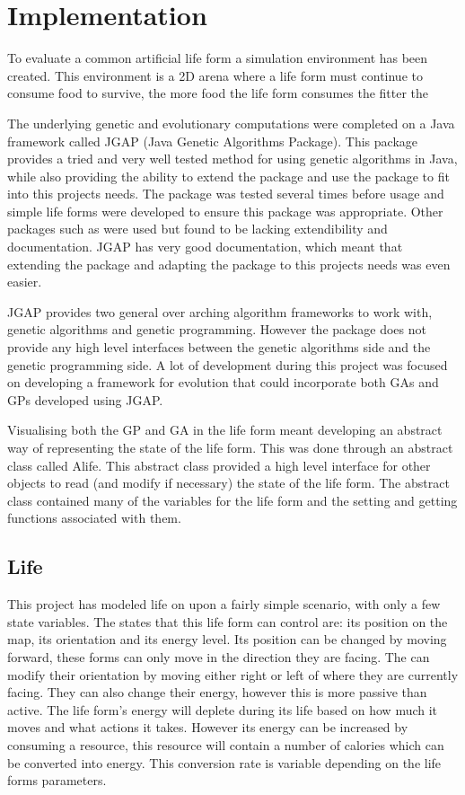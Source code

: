 \documentclass[12pt]{article}
\begin{document}
\section{Implementation}
To evaluate a common artificial life form a simulation environment has been created.
This environment is a 2D arena where a life form must continue to consume food to survive, the more food the life form consumes the fitter the  

The underlying genetic and evolutionary computations were completed on a Java framework called JGAP (Java Genetic Algorithms Package).
This package provides a tried and very well tested method for using genetic algorithms in Java, while also providing the 
ability to extend the package and use the package to fit into this projects needs. The package was tested several times before usage
and simple life forms were developed to ensure this package was appropriate. Other packages such as %
were used but found to be lacking extendibility and documentation. JGAP has very good documentation, which meant that extending
the package and adapting the package to this projects needs was even easier.

JGAP provides two general over arching algorithm frameworks to work with, genetic algorithms and genetic programming. However
the package does not provide any high level interfaces between the genetic algorithms side and the genetic programming side. A 
lot of development during this project was focused on developing a framework for evolution that could incorporate both GAs and GPs developed
using JGAP. 

Visualising both the GP and GA in the life form meant developing an abstract way of representing the state of the life form. This was done
through an abstract class called Alife. This abstract class provided a high level interface for other objects to read (and modify if necessary)
the state of the life form. The abstract class contained many of the variables for the life form and the setting and getting functions 
associated with them. 

\subsection{Life}

This project has modeled life on upon a fairly simple scenario, with only a few state variables. The states that this life form
can control are: its position on the map, its orientation and its energy level. Its position can be changed by moving forward, these 
forms can only move in the direction they are facing. The can modify their orientation by moving either right or left of where they 
are currently facing. They can also change their energy, however this is more passive than active. The life form's energy will
deplete during its life based on how much it moves and what actions it takes. However its energy can be increased by consuming a 
resource, this resource will contain a number of calories which can be converted into energy. This conversion rate is variable
depending on the life forms parameters. 
\end{document}
